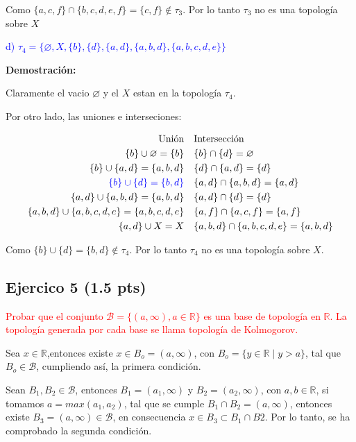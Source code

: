 \documentclass[
]{article}
\begin{document}
Como \(\{a,c,f\} \cap \{b,c,d,e,f\}=\{c,f\} \notin \tau_3\). Por lo
tanto \(\tau_{3}\) no es una topología sobre \(X\)

\textcolor{blue}{d) $\tau_{4} =\{ \varnothing,X,\{b\},\{d\},\{a,d\},\{a,b,d\},\{a,b,c,d,e\}\}$}

\textbf{Demostración:}

Claramente el vacio \(\varnothing\) y el \(X\) estan en la topología
\(\tau_4\).

Por otro lado, las uniones e interseciones:

\begin{align*}
\mbox{Unión}                                  &        &          &\mbox{Intersección} \\
\{b\} \cup \varnothing =\{b\}                 &        &          &\{b\} \cap \{d\}=\varnothing \\
\{b\} \cup \{a,d\}=\{a,b,d\}                  &        &          &\{d\} \cap \{a,d\}=\{d\} \\
\textcolor{blue}{\{b\} \cup \{d\}=\{b,d\}}                      &        &          &\{a,d\} \cap \{a,b,d\}=\{a,d\} \\
\{a,d\} \cup \{a,b,d\}= \{a,b,d\}             &        &          &\{a,d\} \cap \{d\}=\{d\} \\
\{a,b,d\} \cup \{a,b,c,d,e\}=\{a,b,c,d,e\}    &        &          &\{a,f\} \cap \{a,c,f\}=\{a,f\} \\
\{a,d\} \cup X = X                            &        &          &\{a,b,d\} \cap \{a,b,c,d,e\}=\{a,b,d\} 
\end{align*}

Como \(\{b\} \cup \{d\}=\{b,d\} \notin \tau_4\). Por lo tanto
\(\tau_{4}\) no es una topología sobre \(X\).

\hypertarget{ejercico-5-1.5-pts}{%
\subsection{Ejercico 5 (1.5 pts)}\label{ejercico-5-1.5-pts}}

\textcolor{red}{Probar que el conjunto $\mathcal{B}=\{(a,\infty), a \in \mathbb{R}\}$ es una base de topología en $\mathbb{R}$. La topología generada por cada base se llama topología de Kolmogorov.}

Sea \(x \in \mathbb{R}\),entonces existe \(x \in B_o=(a, \infty)\), con
\(B_o=\{ y \in \mathbb{R} \mid y > a\}\), tal que
\(B_o \in \mathcal{B}\), cumpliendo así, la primera condición.

Sean \(B_1,B_2 \in \mathcal{B}\), entonces \(B_1=(a_1, \infty)\) y
\(B_2=(a_2, \infty)\), con \(a,b \in \mathbb{R}\), si tomamos
\(a=max(a_1,a_2)\), tal que se cumple \(B_1 \cap B_2=(a, \infty)\),
entonces existe \(B_3=(a,\infty) \in \mathcal{B}\), en consecuencia
\(x\in B_3 \subset B_1 \cap B2\). Por lo tanto, se ha comprobado la
segunda condición.
\end{document}
